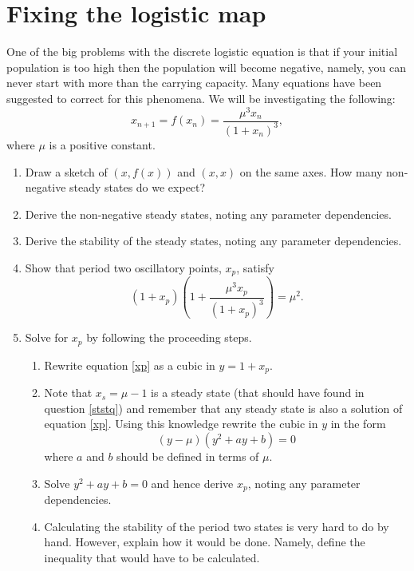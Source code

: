 \documentclass[10pt]{article}
\newcommand{\bb}{\begin{equation}}
\newcommand{\ee}{\end{equation}}
\newcommand{\eqn}[1]{equation \eqref{#1}}
\renewcommand{\l}{\left(}
\renewcommand{\r}{\right)}
\begin{document}
\section{Fixing the logistic map}\label{Fixing the logistic map}
One of the big problems with the discrete logistic equation is that if your initial population is too high then the population will become negative, namely, you can never start with more than the carrying capacity. Many equations have been suggested to correct for this phenomena. We will be investigating the following:
\bb
x_{n+1}=f(x_n)=\frac{\mu^3 x_n}{(1+x_n)^3},\label{Inverse_cubic}
\ee
where $\mu$ is a positive constant.
\begin{enumerate}
\item Draw a sketch of $(x,f(x))$ and $(x,x)$ on the same axes. How many non-negative steady states do we expect?

\item Derive the non-negative steady states, noting any parameter dependencies.\label{ststq}

\item Derive the stability of the steady states, noting any parameter dependencies.

\item Show that period two oscillatory points, $x_p$, satisfy
\bb
\l 1+x_p \r \l 1+\frac {\mu^3 x_p}{ \l 1+x_p \r^3} \r=\mu^2.\label{xp}
\ee

\item Solve for $x_p$ by following the proceeding steps.
\begin{enumerate}

\item Rewrite \eqn{xp} as a cubic in $y=1+x_p$.

\item Note that $x_s=\mu-1$ is a steady state (that should have found in question \ref{ststq}) and remember that any steady state is also a solution of \eqn{xp}. Using this knowledge rewrite the cubic in $y$ in the form
\bb
(y-\mu)(y^2+ay+b)=0
\ee 
where $a$ and $b$ should be defined in terms of $\mu$.

\item Solve $y^2+ay+b=0$ and hence derive $x_p$, noting any parameter dependencies.

\item Calculating the stability of the period two states is very hard to do by hand. However, explain how it would be done. Namely, define the inequality that would have to be calculated.


\end{enumerate}
\end{enumerate}
\end{document}
